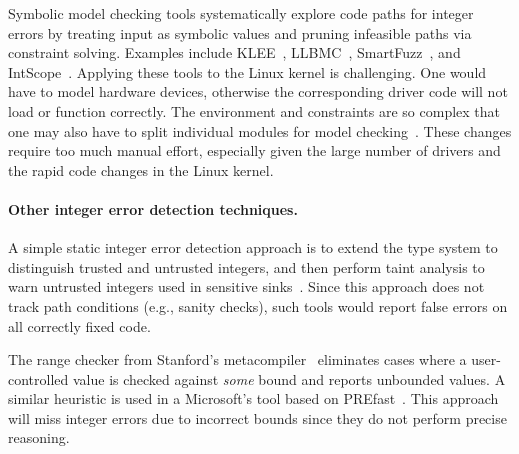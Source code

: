 

Symbolic model checking tools systematically explore code paths
for integer errors by treating input as symbolic values and pruning
infeasible paths via constraint solving.  Examples include
KLEE~\cite{cadar:klee},
LLBMC~\cite{llbmc},
SmartFuzz~\cite{molnar:catchconv},
and
IntScope~\cite{intscope}.
Applying these tools to the Linux kernel is challenging.  One would
have to model hardware devices, otherwise the corresponding driver
code will not load or function correctly.  The environment and
constraints are so complex that one may also have to split
individual modules for model checking~\cite{engler:vs}.  These
changes require too much manual effort, especially given the
large number of drivers and the rapid code changes in the Linux
kernel.


\paragraph{Other integer error detection techniques.}
A simple static integer error detection approach is to extend the
type system to distinguish trusted and untrusted integers, and then
perform taint analysis to warn untrusted integers used in sensitive
sinks~\cite{cqual, lclint}.  Since this approach does not track
path conditions (e.g., sanity checks), such tools would report false
errors on all correctly fixed code.

The range checker from Stanford's metacompiler~\cite{range-checker}
eliminates cases where a user-controlled value is checked against
\emph{some} bound and reports unbounded values.  A similar heuristic
is used in a Microsoft's tool based on PREfast~\cite{prefast}.  This
approach will miss integer errors due to incorrect bounds since
they do not perform precise reasoning.


